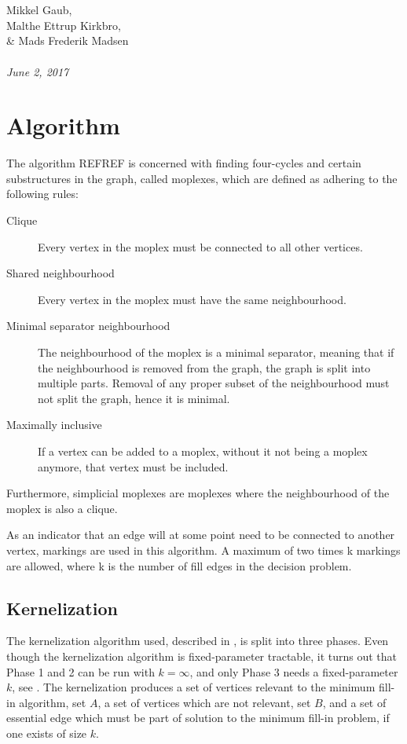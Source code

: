 \documentclass{article}
\begin{document}
\begin{titlepage}
		 \\ \\
		Mikkel Gaub, \\ Malthe Ettrup Kirkbro, \\ \& Mads Frederik Madsen	\\ \\
		\hspace{-18pt}
		\textit{June 2, 2017}
		\thispagestyle{empty}
	\end{titlepage}
	\clearpage

	\section{Algorithm}
	The algorithm REFREF is concerned with finding four-cycles and certain substructures in the graph, called moplexes, which are defined as adhering to the following rules: \\

	\begin{description}
		\item[Clique] Every vertex in the moplex must be connected to all other vertices.
		\item[Shared neighbourhood] Every vertex in the moplex must have the same neighbourhood.
		\item[Minimal separator neighbourhood] The neighbourhood of the moplex is a minimal separator, meaning that if the neighbourhood is removed from the graph, the graph is split into multiple parts. Removal of any proper subset of the neighbourhood must not split the graph, hence it is minimal.
		\item[Maximally inclusive] If a vertex can be added to a moplex, without it not being a moplex anymore, that vertex must be included.
	\end{description}

	Furthermore, simplicial moplexes are moplexes where the neighbourhood of the moplex is also a clique.

	As an indicator that an edge will at some point need to be connected to another vertex, markings are used in this algorithm. 
	A maximum of two times k markings are allowed, where k is the number of fill edges in the decision problem.

		\subsection{Kernelization}
		The kernelization algorithm used, described in \cite{kernel}, is split into three phases. Even though the kernelization algorithm is fixed-parameter tractable, it turns out that Phase 1 and 2 can be run with $k=\infty$, and only Phase 3 needs a fixed-parameter $k$, see \cite{polynomial-approx}. The kernelization produces a set of vertices relevant to the minimum fill-in algorithm, set $A$, a set of vertices which are not relevant, set $B$, and a set of essential edge which must be part of solution to the minimum fill-in problem, if one exists of size $k$. 
\end{document}
